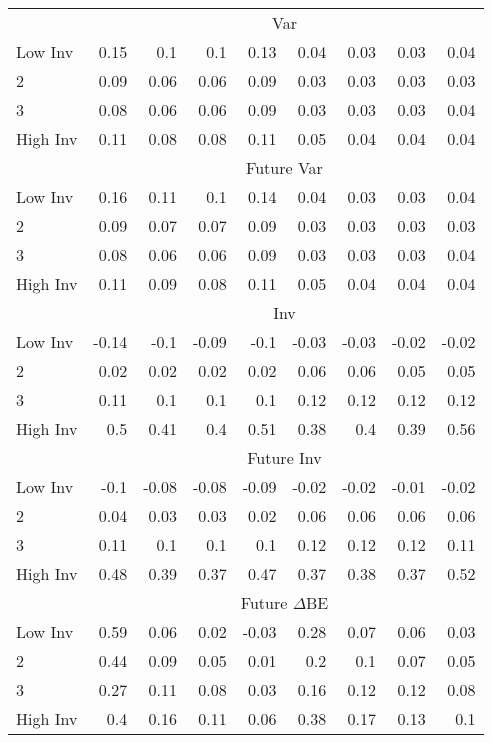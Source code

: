 \begin{table}[!ht]
\begin{tabular}{lrrrrrrrr}
  
    & \multicolumn{8}{c}{Var}  \\
     \cmidrule(r){2-5} \cmidrule(r){6-9}
    Low Inv  & 0.15  & 0.1  & 0.1  & 0.13  & 0.04  & 0.03  & 0.03  & 0.04   \\
    2  & 0.09  & 0.06  & 0.06  & 0.09  & 0.03  & 0.03  & 0.03  & 0.03   \\
    3  & 0.08  & 0.06  & 0.06  & 0.09  & 0.03  & 0.03  & 0.03  & 0.04   \\
    High Inv  & 0.11  & 0.08  & 0.08  & 0.11  & 0.05  & 0.04  & 0.04  & 0.04   \\
    
  
    & \multicolumn{8}{c}{Future Var}  \\
     \cmidrule(r){2-5} \cmidrule(r){6-9}
    Low Inv  & 0.16  & 0.11  & 0.1  & 0.14  & 0.04  & 0.03  & 0.03  & 0.04   \\
    2  & 0.09  & 0.07  & 0.07  & 0.09  & 0.03  & 0.03  & 0.03  & 0.03   \\
    3  & 0.08  & 0.06  & 0.06  & 0.09  & 0.03  & 0.03  & 0.03  & 0.04   \\
    High Inv  & 0.11  & 0.09  & 0.08  & 0.11  & 0.05  & 0.04  & 0.04  & 0.04   \\
    
  
    & \multicolumn{8}{c}{Inv}  \\
     \cmidrule(r){2-5} \cmidrule(r){6-9}
    Low Inv  & -0.14  & -0.1  & -0.09  & -0.1  & -0.03  & -0.03  & -0.02  & -0.02   \\
    2  & 0.02  & 0.02  & 0.02  & 0.02  & 0.06  & 0.06  & 0.05  & 0.05   \\
    3  & 0.11  & 0.1  & 0.1  & 0.1  & 0.12  & 0.12  & 0.12  & 0.12   \\
    High Inv  & 0.5  & 0.41  & 0.4  & 0.51  & 0.38  & 0.4  & 0.39  & 0.56   \\
    
  
    & \multicolumn{8}{c}{Future Inv}  \\
     \cmidrule(r){2-5} \cmidrule(r){6-9}
    Low Inv  & -0.1  & -0.08  & -0.08  & -0.09  & -0.02  & -0.02  & -0.01  & -0.02   \\
    2  & 0.04  & 0.03  & 0.03  & 0.02  & 0.06  & 0.06  & 0.06  & 0.06   \\
    3  & 0.11  & 0.1  & 0.1  & 0.1  & 0.12  & 0.12  & 0.12  & 0.11   \\
    High Inv  & 0.48  & 0.39  & 0.37  & 0.47  & 0.37  & 0.38  & 0.37  & 0.52   \\
    
  
    & \multicolumn{8}{c}{Future $\Delta\text{BE}$}  \\
     \cmidrule(r){2-5} \cmidrule(r){6-9}
    Low Inv  & 0.59  & 0.06  & 0.02  & -0.03  & 0.28  & 0.07  & 0.06  & 0.03   \\
    2  & 0.44  & 0.09  & 0.05  & 0.01  & 0.2  & 0.1  & 0.07  & 0.05   \\
    3  & 0.27  & 0.11  & 0.08  & 0.03  & 0.16  & 0.12  & 0.12  & 0.08   \\
    High Inv  & 0.4  & 0.16  & 0.11  & 0.06  & 0.38  & 0.17  & 0.13  & 0.1   \\
    

\end{tabular}
\end{table}
